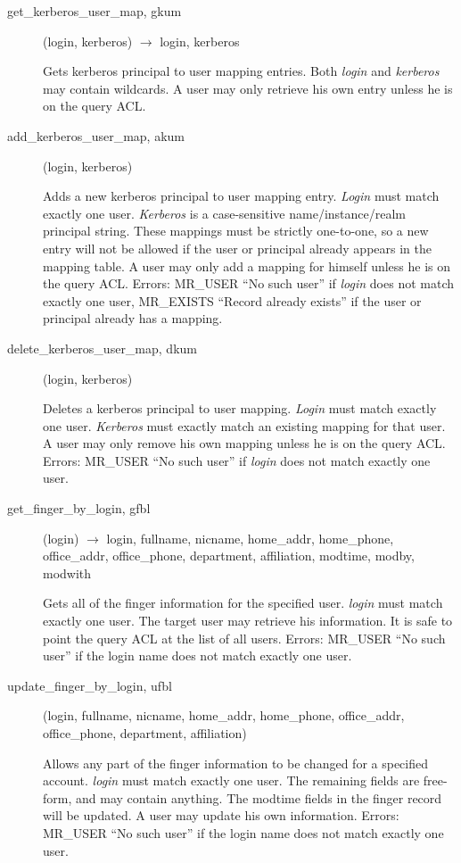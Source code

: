 \begin{description}
\item[get\_kerberos\_user\_map, gkum](login, kerberos) $\rightarrow$ login,
kerberos

Gets kerberos principal to user mapping entries.  Both {\em login} and
{\em kerberos} may contain wildcards.  A user may only retrieve his own
entry unless he is on the query ACL.

\item[add\_kerberos\_user\_map, akum](login, kerberos)

Adds a new kerberos principal to user mapping entry.  {\em Login} must
match exactly one user.  {\em Kerberos} is a case-sensitive
name/instance/realm principal string.  These mappings must be strictly
one-to-one, so a new entry will not be allowed if the user or
principal already appears in the mapping table.  A user may only add a
mapping for himself unless he is on the query ACL.  Errors: MR\_USER
``No such user'' if {\em login} does not match exactly one user,
MR\_EXISTS ``Record already exists'' if the user or principal already
has a mapping.

\item[delete\_kerberos\_user\_map, dkum](login, kerberos)

Deletes a kerberos principal to user mapping.  {\em Login} must match
exactly one user.  {\em Kerberos} must exactly match an existing mapping
for that user.  A user may only remove his own mapping unless he is on
the query ACL.  Errors: MR\_USER ``No such user'' if {\em login} does not
match exactly one user.

\item[get\_finger\_by\_login, gfbl](login) $\rightarrow$ login, fullname, nicname,
home\_addr, home\_phone, office\_addr, office\_phone, department,
affiliation, modtime, modby, modwith

Gets all of the finger information for the specified user.  {\em login}
must match exactly one user.  The target user may retrieve his
information.  It is safe to point the query ACL at the list of all
users.  Errors: MR\_USER ``No such user'' if the login name does not
match exactly one user.

\item[update\_finger\_by\_login, ufbl](login, fullname, nicname, home\_addr,
home\_phone, office\_addr, office\_phone, department, affiliation)

Allows any part of the finger information to be changed for a
specified account.  {\em login} must match exactly one user.  The
remaining fields are free-form, and may contain anything.  The modtime
fields in the finger record will be updated.  A user may update his
own information.  Errors: MR\_USER ``No such user'' if the login name
does not match exactly one user.


\end{description}
